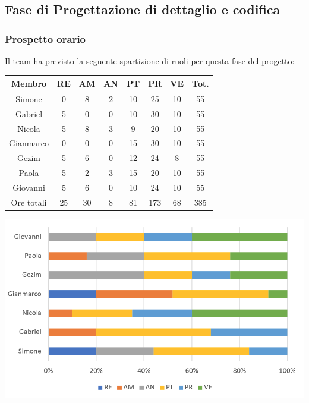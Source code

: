 \newpage
\subsection{Fase di Progettazione di dettaglio e codifica}
\subsubsection{Prospetto orario}
Il team ha previsto la seguente spartizione di ruoli per questa fase del progetto:
\\
\begin{center}
\begin{tabular}{ |c|c|c|c|c|c|c|c|  }
 \hline
 Membro 		& RE 	& AM 	& AN 	& PT 	& PR 	& VE 	& Tot.\\
 \hline\hline
 Simone			& 0 		& 8		& 2 	& 10 	& 25 		& 10 		& 55\\
 Gabriel		& 5 		& 0 		& 0 	& 10		& 30 		& 10 		& 55\\
 Nicola			& 5 		& 8 		& 3 	& 9 		& 20 		& 10 		& 55\\
 Gianmarco		& 0 		& 0 		& 0 	& 15 	& 30 		& 10 		& 55\\
 Gezim			& 5 		& 6 		& 0 	& 12 	& 24 		& 8	 		& 55\\
 Paola			& 5 		& 2 		& 3 	& 15 	& 20 		& 10 		& 55\\
 Giovanni		& 5 		& 6	 	& 0 	& 10 	& 24 		& 10  		& 55\\
 \hline\hline
 Ore totali		& 25		& 30		& 8 	& 81	 	& 173 	& 68 	& 385\\
  \hline
\end{tabular}
\end{center}
\includegraphics[width=\textwidth]{res/img/hi33}
\\
